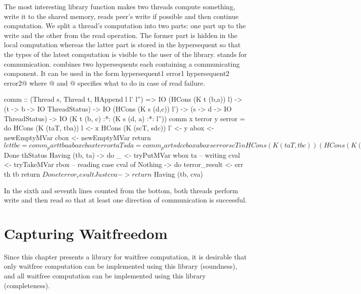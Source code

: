The most interesting
library function \verb@comm@ makes two threads compute something, write it to
the shared memory, reads peer's write if possible and then continue
computation. We split a thread's computation into two parts: one part
up to the write and the other from the read operation. The former part is
hidden in the local computation whereas the latter part is stored in the
hypersequent so that the types of the latest computation is visible to
the user of the library.
\verb@comm@ stands for communication.  \verb@comm@ combines two
hypersequents each containing
a communicating component.
It can be used in the form
\verb@comm hypersequent1 error1 hypersequent2 error2@ where @ and
@ specifies what to do in case of read failure.
\begin{code}
comm :: (Thread s, Thread t, HAppend l l' l'') =>
        IO (HCons (K t (b,a)) l)
         -> (t -> b -> IO ThreadStatus)
         -> IO (HCons (K s (d,c)) l')
         -> (s -> d -> IO ThreadStatus)
         -> IO (K t (b, c) :*: (K s (d, a) :*: l''))
comm x terror y serror = do
  HCons (K (taT, tba)) l <- x
  HCons (K (scT, sdc)) l' <- y
  abox <- newEmptyMVar
  cbox <- newEmptyMVar
  return $ let
      tbc = comm_part tba abox cbox terror taT
      sda = comm_part sdc cbox abox serror scT
    in
    HCons (K (taT, tbc))
      (HCons (K (scT, sda)) (hAppend l l'))
    where
      comm_part tba wbox rbox err th = do
            maybeba <- tba
            case maybeba of
              Done thStatus -> return $ Done thStatus
              Having (tb, ta) -> do
                _ <- tryPutMVar wbox ta    -- writing
                cval <- tryTakeMVar rbox   -- reading
                case cval of
                  Nothing -> do
                    terror_result <- err th tb
                    return $ Done terror_result
                  Just cva -> return $ Having (tb, cva)
\end{code}
In the sixth and seventh lines counted from the bottom, both threads
perform write and then read so that at least one
direction of communication is successful.

\section{Capturing Waitfreedom}

Since this chapter presents a library for waitfree computation, it is
desirable that only waitfree computation can be implemented using this
library (soundness), and all waitfree computation can be implemented
using this library (completeness).


